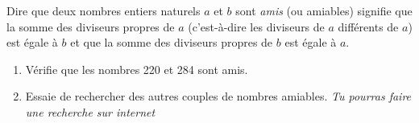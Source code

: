
Dire que deux nombres entiers naturels $a$ et $b$ sont {\em amis} (ou amiables) signifie que la somme des diviseurs propres de $a$ (c'est-à-dire les diviseurs de $a$ différents de $a$) est égale à $b$ et que la somme des diviseurs propres de $b$ est égale à $a$.
\begin{enumerate}
\item Vérifie que les nombres 220 et 284 sont amis.
\item Essaie de rechercher des autres couples de nombres amiables. \textit{Tu pourras faire une recherche sur internet}
\end{enumerate}
